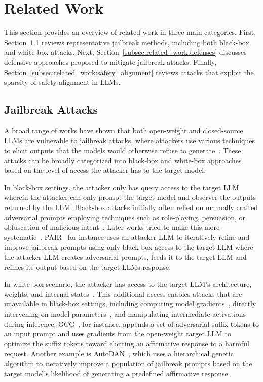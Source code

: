 \section{Related Work}
\label{sec:related_work}
This section provides an overview of related work in three main categories. First, Section~\ref{subsec:related_work:jailbreak_attacks} reviews representative jailbreak methods, including both black-box and white-box attacks. Next, Section~\ref{subsec:related_work:defenses} discusses defensive approaches proposed to mitigate jailbreak attacks. Finally, Section~\ref{subsec:related_work:safety_alignment} reviews attacks that exploit the sparsity of safety alignment in LLMs.

\subsection{Jailbreak Attacks}
\label{subsec:related_work:jailbreak_attacks}
A broad range of works have shown that both open-weight and closed-source LLMs are vulnerable to jailbreak attacks, where attackers use various techniques to elicit outputs that the models would otherwise refuse to generate~\cite{wei2023jailbroken, chao2025pair, andriushchenko2025simpleadaptive, twinbreak, wu2026neurostrike, arditi2024refusal, ding2023renellm}. These attacks can be broadly categorized into black-box and white-box approaches based on the level of access the attacker has to the target model.

In black-box settings, the attacker only has query access to the target LLM wherein the attacker can only prompt the target model and observer the outputs returned by the LLM. Black-box attacks initially often relied on manually crafted adversarial prompts employing techniques such as role-playing, persuasion, or obfuscation of malicious intent~\cite{johnny2024, dualuse, dan2024}. Later works tried to make this more systematic~\cite{chao2025pair, ding2023renellm, mehrotra2024tap}. PAIR~\cite{chao2025pair, llmfuzzer} for instance uses an attacker LLM to iteratively refine and improve jailbreak prompts using only black-box access to the target LLM where the attacker LLM creates adversarial prompts, feeds it to the target LLM and refines its output based on the target LLMs response. 

In white-box scenario, the attacker has access to the target LLM's architecture, weights, and internal states~\cite{zou2023GCG, liu2024autodan, wu2026neurostrike, twinbreak, arditi2024refusal}. This additional access enables attacks that are unavailable in black-box settings, including computing model gradients~\cite{zou2023GCG}, directly intervening on model parameters~\cite{wu2026neurostrike, twinbreak}, and manipulating intermediate activations~\cite{arditi2024refusal} during inference. GCG~\cite{zou2023GCG}, for instance, appends a set of adversarial suffix tokens to an input prompt and uses gradients from the open-weight target LLM to optimize the suffix tokens toward eliciting an affirmative response to a harmful request. Another example is AutoDAN~\cite{liu2024autodan}, which uses a hierarchical genetic algorithm to iteratively improve a population of jailbreak prompts based on the target model's likelihood of generating a predefined affirmative response.

